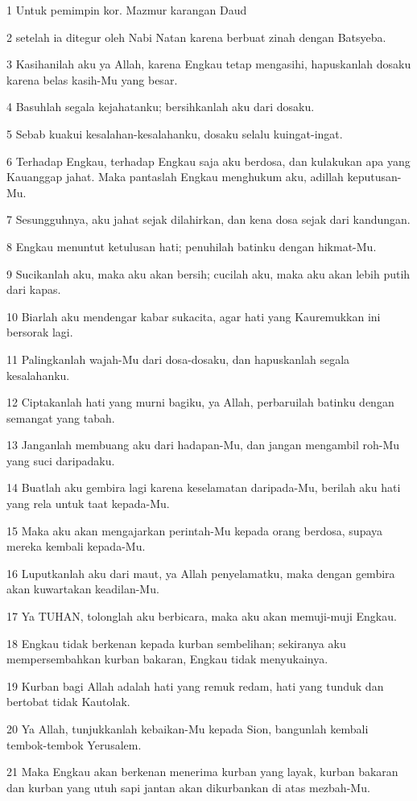 \par 1 Untuk pemimpin kor. Mazmur karangan Daud
\par 2 setelah ia ditegur oleh Nabi Natan karena berbuat zinah dengan Batsyeba.
\par 3 Kasihanilah aku ya Allah, karena Engkau tetap mengasihi, hapuskanlah dosaku karena belas kasih-Mu yang besar.
\par 4 Basuhlah segala kejahatanku; bersihkanlah aku dari dosaku.
\par 5 Sebab kuakui kesalahan-kesalahanku, dosaku selalu kuingat-ingat.
\par 6 Terhadap Engkau, terhadap Engkau saja aku berdosa, dan kulakukan apa yang Kauanggap jahat. Maka pantaslah Engkau menghukum aku, adillah keputusan-Mu.
\par 7 Sesungguhnya, aku jahat sejak dilahirkan, dan kena dosa sejak dari kandungan.
\par 8 Engkau menuntut ketulusan hati; penuhilah batinku dengan hikmat-Mu.
\par 9 Sucikanlah aku, maka aku akan bersih; cucilah aku, maka aku akan lebih putih dari kapas.
\par 10 Biarlah aku mendengar kabar sukacita, agar hati yang Kauremukkan ini bersorak lagi.
\par 11 Palingkanlah wajah-Mu dari dosa-dosaku, dan hapuskanlah segala kesalahanku.
\par 12 Ciptakanlah hati yang murni bagiku, ya Allah, perbaruilah batinku dengan semangat yang tabah.
\par 13 Janganlah membuang aku dari hadapan-Mu, dan jangan mengambil roh-Mu yang suci daripadaku.
\par 14 Buatlah aku gembira lagi karena keselamatan daripada-Mu, berilah aku hati yang rela untuk taat kepada-Mu.
\par 15 Maka aku akan mengajarkan perintah-Mu kepada orang berdosa, supaya mereka kembali kepada-Mu.
\par 16 Luputkanlah aku dari maut, ya Allah penyelamatku, maka dengan gembira akan kuwartakan keadilan-Mu.
\par 17 Ya TUHAN, tolonglah aku berbicara, maka aku akan memuji-muji Engkau.
\par 18 Engkau tidak berkenan kepada kurban sembelihan; sekiranya aku mempersembahkan kurban bakaran, Engkau tidak menyukainya.
\par 19 Kurban bagi Allah adalah hati yang remuk redam, hati yang tunduk dan bertobat tidak Kautolak.
\par 20 Ya Allah, tunjukkanlah kebaikan-Mu kepada Sion, bangunlah kembali tembok-tembok Yerusalem.
\par 21 Maka Engkau akan berkenan menerima kurban yang layak, kurban bakaran dan kurban yang utuh sapi jantan akan dikurbankan di atas mezbah-Mu.

